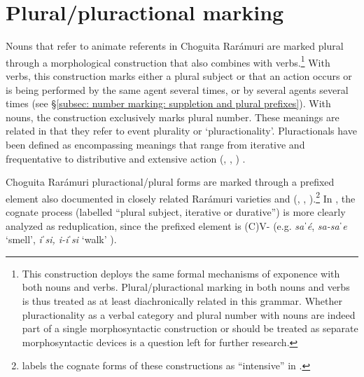\section{Plural/pluractional marking}
\label{sec: pluractional marking}

Nouns that refer to animate referents in Choguita Rarámuri are marked plural through a morphological construction that also combines with verbs.\footnote{This construction deploys the same formal mechanisms of exponence with both nouns and verbs. Plural/pluractional marking in both nouns and verbs is thus treated as at least diachronically related in this grammar. Whether pluractionality as a verbal category and plural number with nouns are indeed part of a single morphosyntactic construction or should be treated as separate morphosyntactic devices is a question left for further research.} With verbs, this construction marks either a plural subject or that an action occurs or is being performed by the same agent several times, or by several agents several times (see §\ref{subsec: number marking: suppletion and plural prefixes}). With nouns, the construction exclusively marks plural number. These meanings are related in that they refer to event plurality or ‘pluractionality’. Pluractionals have been defined as encompassing meanings that range from iterative and frequentative to distributive and extensive action (\citealt{newman1990nominal}, \citealt{newman2012pluractional}, \citealt{wood2007semantic}) .

Choguita Rarámuri pluractional/plural forms are marked through a prefixed element also documented in closely related Rarámuri varieties and  (\citealt{lionnet1968intensivos}, \citealt{lionnet1985lionnet}, \citealt{miller1996guarijio}).\footnote{\citet{lionnet2001elementos} labels the cognate forms of these constructions as “intensive” in .} In , the cognate process (labelled “plural subject, iterative or durative”) is more clearly analyzed as reduplication, since the prefixed element is (C)V- (e.g. \textit{saˈé}, \textit{sa-saˈe} ‘smell’, \textit{iˈsi, i-iˈsi} ‘walk’ \citep[][62]{miller1996guarijio}).

